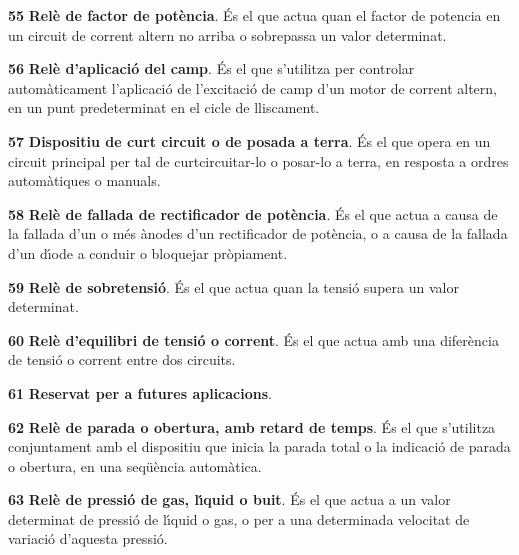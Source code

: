 \begin{multicols}{2}
\begin{list}{}
\item[\textbf{55}]  \textbf{Rel\`{e} de factor de pot\`{e}ncia}.
\'{E}s el que actua quan el factor de potencia en un circuit de corrent altern no arriba o
sobrepassa un valor determinat.

\item[\textbf{56}]  \textbf{Rel\`{e} d'aplicaci\'{o} del camp}.
\'{E}s el que s'utilitza per controlar autom\`{a}ticament l'aplicaci\'{o} de l'excitaci\'{o} de camp d'un
motor de corrent altern, en un punt predeterminat en el cicle de lliscament.

\item[\textbf{57}] 
\textbf{Dispositiu de curt circuit o de posada a terra}. \'{E}s el que
opera en un circuit principal per tal de curtcircuitar-lo  o
posar-lo a terra, en resposta a ordres autom\`{a}tiques o manuals.

\item[\textbf{58}]  \textbf{Rel\`{e} de
fallada de rectificador de pot\`{e}ncia}. \'{E}s el que actua a causa de la
fallada d'un o m\'{e}s \`{a}nodes d'un rectificador de pot\`{e}ncia, o a causa
de la fallada d'un d\'{\i}ode a conduir o bloquejar pr\`{o}piament.

\item[\textbf{59}]  \textbf{Rel\`{e} de sobretensi\'{o}}. \'{E}s el que
actua quan la tensi\'{o} supera un valor determinat.

\item[\textbf{60}]  \textbf{Rel\`{e} d'equilibri de
tensi\'{o} o corrent}. \'{E}s el que actua amb una difer\`{e}ncia de tensi\'{o} o
corrent entre dos circuits.

\item[\textbf{61}] \textbf{Reservat per a  futures aplicacions}.

\item[\textbf{62}]  \textbf{Rel\`{e} de
parada o obertura, amb retard de temps}. \'{E}s el que s'utilitza
conjuntament amb el dispositiu que inicia la parada total o la
indicaci\'{o} de parada o obertura, en una seq\"{u}\`{e}ncia autom\`{a}tica.

\item[\textbf{63}]  \textbf{Rel\`{e} de pressi\'{o}
de gas, l\'{\i}quid o buit}. \'{E}s el que actua a un valor determinat de
pressi\'{o} de l\'{\i}quid o gas, o per a una determinada velocitat de
variaci\'{o} d'aquesta pressi\'{o}.


\end{list}
\end{multicols}
